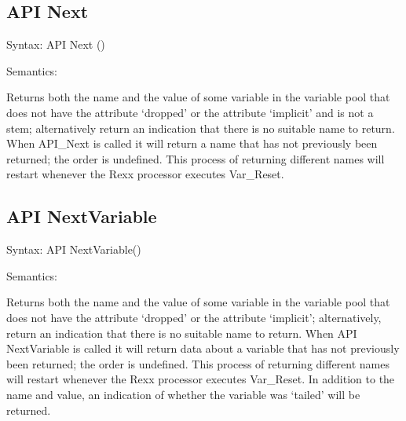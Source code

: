 \hypertarget{api-next}{%
\subsection{API Next}\label{api-next}}

Syntax: API Next ()

Semantics:

Returns both the name and the value of some variable in the variable
pool that does not have the attribute `dropped' or the attribute
`implicit' and is not a stem; alternatively return an indication that
there is no suitable name to return. When API\_Next is called it will
return a name that has not previously been returned; the order is
undefined. This process of returning different names will restart
whenever the Rexx processor executes Var\_Reset.

\hypertarget{api-nextvariable}{%
\subsection{API NextVariable}\label{api-nextvariable}}

Syntax: API NextVariable()

Semantics:

Returns both the name and the value of some variable in the variable
pool that does not have the attribute `dropped' or the attribute
`implicit'; alternatively, return an indication that there is no
suitable name to return. When API NextVariable is called it will return
data about a variable that has not previously been returned; the order
is undefined. This process of returning different names will restart
whenever the Rexx processor executes Var\_Reset. In addition to the name
and value, an indication of whether the variable was `tailed' will be
returned.
